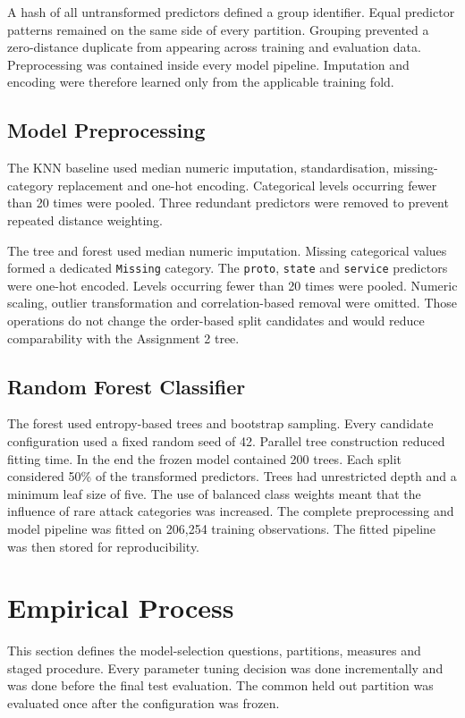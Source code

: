 \documentclass[conference]{IEEEtran}
\begin{document}
A hash of all untransformed predictors defined a group identifier. Equal predictor patterns remained on the same side of every partition. Grouping prevented a zero-distance duplicate from appearing across training and evaluation data. Preprocessing was contained inside every model pipeline. Imputation and encoding were therefore learned only from the applicable training fold.

\subsection{Model Preprocessing}

The KNN baseline used median numeric imputation, standardisation, missing-category replacement and one-hot encoding. Categorical levels occurring fewer than 20 times were pooled. Three redundant predictors were removed to prevent repeated distance weighting.

The tree and forest used median numeric imputation. Missing categorical values formed a dedicated \texttt{Missing} category. The \texttt{proto}, \texttt{state} and \texttt{service} predictors were one-hot encoded. Levels occurring fewer than 20 times were pooled. Numeric scaling, outlier transformation and correlation-based removal were omitted. Those operations do not change the order-based split candidates and would reduce comparability with the Assignment 2 tree.

\subsection{Random Forest Classifier}

The forest used entropy-based trees and bootstrap sampling. Every candidate configuration used a fixed random seed of 42. Parallel tree construction reduced fitting time. In the end the frozen model contained 200 trees. Each split considered 50\% of the transformed predictors. Trees had unrestricted depth and a minimum leaf size of five. The use of balanced class weights meant that the influence of rare attack categories was increased. The complete preprocessing and model pipeline was fitted on 206,254 training observations. The fitted pipeline was then stored for reproducibility.

\section{Empirical Process}

This section defines the model-selection questions, partitions, measures and staged procedure. Every parameter tuning decision was done incrementally and was done before the final test evaluation. The common held out partition was evaluated once after the configuration was frozen.
\end{document}
